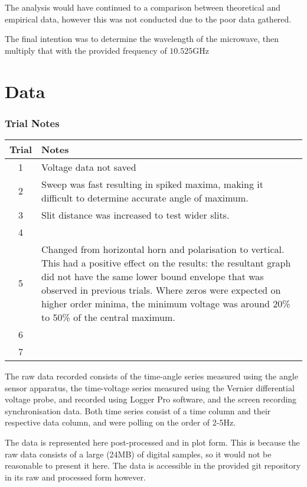 The analysis would have continued to a comparison between theoretical and empirical data, however this was not conducted due to the poor data gathered.

The final intention was to determine the wavelength of the microwave, then multiply that with the provided frequency of $10.525$GHz

\section*{Data}

\subsubsection*{Trial Notes}
\begin{center}
\begin{tabularx}{\linewidth}{ |c | X| }
 \hline
 Trial & Notes \\ 
\hline
 1 & Voltage data not saved \\ 
 2 & Sweep was fast resulting in spiked maxima, making it difficult to determine accurate angle of maximum. \\ 
 3 & Slit distance was increased to test wider slits. \\ 
 4 &  \\ 
 5 & Changed from horizontal horn and polarisation to vertical. This had a positive effect on the results: the resultant graph did not have the same lower bound envelope that was observed in previous trials. Where zeros were expected on higher order minima, the minimum voltage was around 20\% to 50\% of the central maximum. \\ 
 6 &  \\ 
 7 &  \\ 
 \hline
\end{tabularx}
\end{center}

The raw data recorded consists of the time-angle series measured using the angle sensor apparatus, the time-voltage series measured using the Vernier differential voltage probe, and recorded using Logger Pro software, and the screen recording synchronisation data. Both time series consist of a time column and their respective data column, and were polling on the order of 2-5Hz.

The data is represented here post-processed and in plot form. This is because the raw data consists of a large (24MB) of digital samples, so it would not be reasonable to present it here. The data is accessible in the provided git repository in its raw and processed form however.

